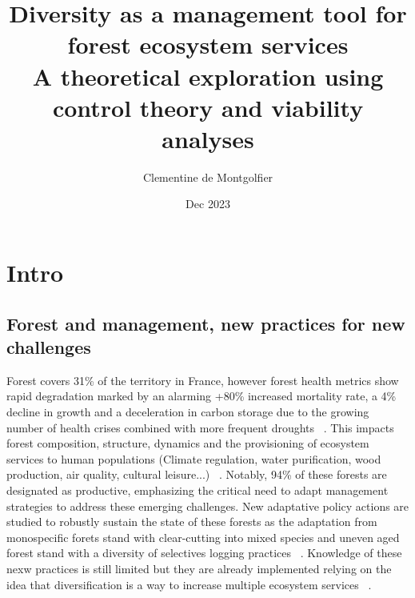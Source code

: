 \documentclass{article}
\title{Diversity as a management tool for forest ecosystem services \\ 
\large A theoretical exploration using control theory and viability analyses}
\author{Clementine de Montgolfier}
\date{Dec 2023}
\begin{document}





\newpage



\newpage

\begin{singlespace}
    \tableofcontents
\end{singlespace}

\newpage


\section{Intro}

\subsection{Forest and management, new practices for new challenges}

Forest covers 31\% of the territory in France, however forest health metrics show rapid degradation  marked by an alarming +80\% increased mortality rate, a 4\% decline in growth and a deceleration in carbon storage due to the growing number of health crises combined with more frequent droughts ~\autocite{IGN}. This impacts forest composition, structure, dynamics and the provisioning of ecosystem services to human populations (Climate regulation, water purification, wood production, air quality, cultural leisure...) ~\autocite{grammatikopoulouValueForestEcosystem2021}. Notably, 94\% of these forests are designated as productive, emphasizing the critical need to adapt management strategies to address these emerging challenges. 
New adaptative policy actions are studied to robustly sustain the state of these forests as the adaptation from monospecific forets stand with clear-cutting into mixed species and uneven aged forest stand with a diversity of selectives logging practices  ~\autocite{raymondIrregularShelterwoodSystem2009}. Knowledge of these nexw practices is still limited but they are already implemented relying on the idea that diversification is a way to increase multiple ecosystem services ~\autocite{tilmanBiodiversityPopulationEcosystem1996}.
\end{document}
